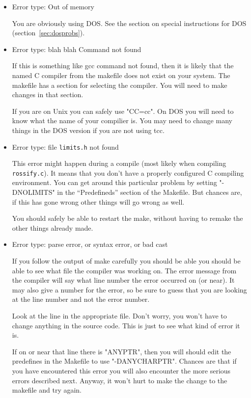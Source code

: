 \documentclass[%
	11pt,
        a4paper,
        twoside]{workrep}
\newcommand*{\file}[1]{\texttt{#1}}		%
\begin{document}
\begin{itemize}
\item Error type:   Out of memory

    You are obviously using DOS.  See the section on special
    instructions for DOS (section~\ref{sec:dosprobs}).

\item Error type:  blah blah Command not found

    If this is something like gcc command not found, then it is likely
    that the named C compiler from the makefile does not exist on
    your system.  The makefile has a section for selecting the compiler.
    You will need to make changes in that section.

    If you are on Unix you can safely use "CC=cc".  On DOS you will
    need to know what the name of your compilier is.  You may need to
    change many things in the DOS version if you are not using tcc.

\item Error type:  file \file{limits.h} not found

    This error might happen during a compile (most likely when
    compiling \file{rossify.c}).  It means that you don't have
    a properly configured C compiling environment.  You can get around
    this particular problem by setting "-DNOLIMITS" in the ``Predefineds''
    section of the Makefile.  But chances are, if this has gone wrong
    other things will go wrong as well.

    You should safely be able to restart the make, without having
    to remake the other things already made.

\item Error type:  parse error, or syntax error, or bad cast

    If you follow the output of make carefully you should be able
    you should be able to see what file the compiler was working
    on.  The error message from the compiler will say what line
    number the error occurred on (or near).  It may also give
    a number for the error, so be sure to guess that you are looking
    at the line number and not the error number.

    Look at the line in the appropriate file.  Don't worry, you won't
    have to change anything in the source code.  This is just to see
    what kind of error it is.

    If on or near that line there is "ANYPTR", then you will should
    edit the predefines in the Makefile to use "-DANYCHARPTR".  Chances
    are that if you have encountered this error you will also encounter
    the more serious errors described next.  Anyway, it won't hurt to make
    the change to the makefile and try again.


\end{itemize}
\end{document}
